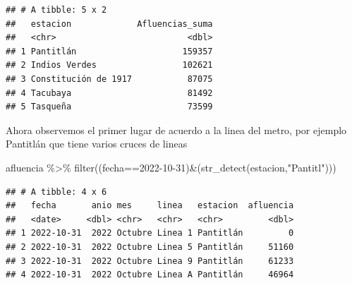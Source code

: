 \documentclass[
]{article}
\newenvironment{Shaded}{\begin{snugshade}}{\end{snugshade}}
\newcommand{\AttributeTok}[1]{\textcolor[rgb]{0.77,0.63,0.00}{#1}}
\newcommand{\DecValTok}[1]{\textcolor[rgb]{0.00,0.00,0.81}{#1}}
\newcommand{\FunctionTok}[1]{\textcolor[rgb]{0.00,0.00,0.00}{#1}}
\newcommand{\NormalTok}[1]{#1}
\newcommand{\OtherTok}[1]{\textcolor[rgb]{0.56,0.35,0.01}{#1}}
\newcommand{\SpecialCharTok}[1]{\textcolor[rgb]{0.00,0.00,0.00}{#1}}
\newcommand{\StringTok}[1]{\textcolor[rgb]{0.31,0.60,0.02}{#1}}
\begin{document}
\begin{Shaded}
\end{Shaded}

\begin{verbatim}
## # A tibble: 5 x 2
##   estacion             Afluencias_suma
##   <chr>                          <dbl>
## 1 Pantitlán                     159357
## 2 Indios Verdes                 102621
## 3 Constitución de 1917           87075
## 4 Tacubaya                       81492
## 5 Tasqueña                       73599
\end{verbatim}

Ahora observemos el primer lugar de acuerdo a la linea del metro, por
ejemplo Pantitlán que tiene varios cruces de lineas

\begin{Shaded}
\begin{Highlighting}[]
\NormalTok{afluencia }\SpecialCharTok{\%\textgreater{}\%} \FunctionTok{filter}\NormalTok{((fecha}\SpecialCharTok{==}\StringTok{\textquotesingle{}2022{-}10{-}31\textquotesingle{}}\NormalTok{)}\SpecialCharTok{\&}\NormalTok{(}\FunctionTok{str\_detect}\NormalTok{(estacion,}\StringTok{"Pantitl"}\NormalTok{)))}
\end{Highlighting}
\end{Shaded}

\begin{verbatim}
## # A tibble: 4 x 6
##   fecha       anio mes     linea   estacion  afluencia
##   <date>     <dbl> <chr>   <chr>   <chr>         <dbl>
## 1 2022-10-31  2022 Octubre Linea 1 Pantitlán         0
## 2 2022-10-31  2022 Octubre Linea 5 Pantitlán     51160
## 3 2022-10-31  2022 Octubre Linea 9 Pantitlán     61233
## 4 2022-10-31  2022 Octubre Linea A Pantitlán     46964
\end{verbatim}
\end{document}
